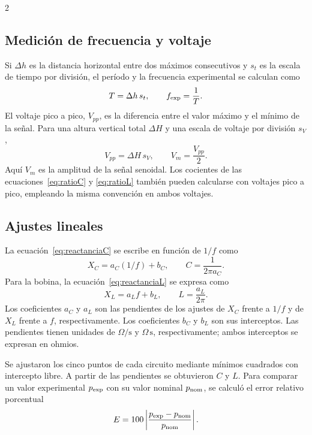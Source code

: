 \documentclass[10pt,letterpaper]{article}
\begin{document}
\clearpage
\begin{multicols}{2}\raggedcolumns
\subsection{Medición de frecuencia y voltaje}
Si $\Delta h$ es la distancia horizontal entre dos máximos consecutivos y $s_t$ es la escala de tiempo por división, el período y la frecuencia experimental se calculan como
\begin{equation}
 T=\Delta h\,s_t,\qquad f_{\rm exp}=\frac{1}{T}.
 \label{eq:tiempo}
\end{equation}
El voltaje pico a pico, $V_{pp}$, es la diferencia entre el valor máximo y el mínimo de la señal. Para una altura vertical total $\Delta H$ y una escala de voltaje por división $s_V$,
\begin{equation}
 V_{pp}=\Delta H\,s_V,\qquad V_m=\frac{V_{pp}}{2}.
 \label{eq:voltaje}
\end{equation}
Aquí $V_m$ es la amplitud de la señal senoidal. Los cocientes de las ecuaciones~\eqref{eq:ratioC} y \eqref{eq:ratioL} también pueden calcularse con voltajes pico a pico, empleando la misma convención en ambos voltajes.

\subsection{Ajustes lineales}
La ecuación~\eqref{eq:reactanciaC} se escribe en función de $1/f$ como
\begin{equation}
 X_C=a_C(1/f)+b_C,\qquad C=\frac{1}{2\pi a_C}.
 \label{eq:ajusteC}
\end{equation}
Para la bobina, la ecuación~\eqref{eq:reactanciaL} se expresa como
\begin{equation}
 X_L=a_Lf+b_L,\qquad L=\frac{a_L}{2\pi}.
 \label{eq:ajusteL}
\end{equation}
Los coeficientes $a_C$ y $a_L$ son las pendientes de los ajustes de $X_C$ frente a $1/f$ y de $X_L$ frente a $f$, respectivamente. Los coeficientes $b_C$ y $b_L$ son sus interceptos. Las pendientes tienen unidades de $\Omega/\mathrm{s}$ y $\Omega\,\mathrm{s}$, respectivamente; ambos interceptos se expresan en ohmios.

Se ajustaron los cinco puntos de cada circuito mediante mínimos cuadrados con intercepto libre. A partir de las pendientes se obtuvieron $C$ y $L$. Para comparar un valor experimental $p_{\rm exp}$ con su valor nominal $p_{\rm nom}$, se calculó el error relativo porcentual
\begin{equation}
 E=100\left|\frac{p_{\rm exp}-p_{\rm nom}}{p_{\rm nom}}\right|.
 \label{eq:error}
\end{equation}


\end{multicols}
\end{document}
